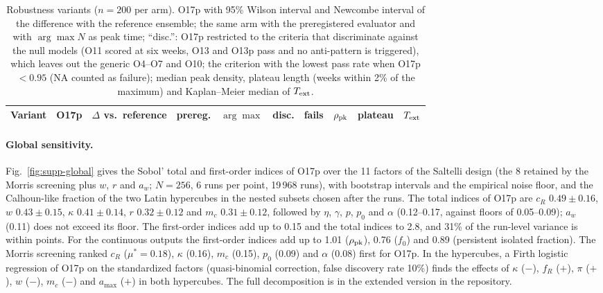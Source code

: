 \documentclass[pre,onecolumn,superscriptaddress,notitlepage]{revtex4-2}
\providecommand{\extended}{the extended version in the repository}
\begin{document}
\begin{table}[ht]
\centering
\caption{Robustness variants ($n=200$ per arm). O17p with 95\% Wilson interval and Newcombe interval of the
difference with the reference ensemble; the same arm with the preregistered evaluator and with $\arg\max N$ as peak
time; ``disc.'': O17p restricted to the criteria that discriminate against the null models (O11 scored at six
weeks, O13 and O13p pass and no anti-pattern is triggered), which leaves out the generic O4--O7 and O10; the
criterion with the lowest pass rate when O17p $<0.95$ (NA counted as failure); median peak density, plateau length
(weeks within 2\% of the maximum) and Kaplan--Meier median of $T_{\rm ext}$.}
\label{tab:res-rob}
\scriptsize
\setlength{\tabcolsep}{3.2pt}
\begin{tabular}{@{}lllccclccc@{}}
\toprule
Variant & O17p & $\Delta$ vs.\ reference & prereg. & $\arg\max$ & disc. & fails & $\rho_{\rm pk}$ & plateau & $T_{\rm ext}$ \\
\midrule

\end{tabular}
\end{table}

\paragraph{Global sensitivity.}
Fig.~\ref{fig:supp-global} gives the Sobol' total and first-order indices of O17p over the 11 factors of the
Saltelli design (the 8 retained by the Morris screening plus $w$, $r$ and $a_w$; $N=256$, 6 runs per point, 19\,968
runs), with bootstrap intervals and the empirical noise floor, and the Calhoun-like fraction of the two Latin
hypercubes in the nested subsets chosen after the runs. The total indices of O17p are $c_R$ $0.49\pm0.16$, $w$
$0.43\pm0.15$, $\kappa$ $0.41\pm0.14$, $r$ $0.32\pm0.12$ and $m_c$ $0.31\pm0.12$, followed by $\eta$, $\gamma$, $p$,
$p_0$ and $\alpha$ (0.12--0.17, against floors of 0.05--0.09); $a_w$ (0.11) does not exceed its floor. The
first-order indices add up to 0.15 and the total indices to 2.8, and 31\% of the run-level variance is within
points. For the continuous outputs the first-order indices add up to 1.01 ($\rho_{\rm pk}$), 0.76 ($f_0$) and 0.89
(persistent isolated fraction). The Morris screening ranked $c_R$ ($\mu^*=0.18$), $\kappa$ (0.16), $m_c$ (0.15),
$p_0$ (0.09) and $\alpha$ (0.08) first for O17p. In the hypercubes, a Firth logistic regression of O17p on the
standardized factors (quasi-binomial correction, false discovery rate 10\%) finds the effects of $\kappa$ ($-$),
$f_R$ ($+$), $\pi$ ($+$), $w$ ($-$), $m_c$ ($-$) and $a_{\max}$ ($+$) in both hypercubes. The full decomposition is
in \extended.
\end{document}

